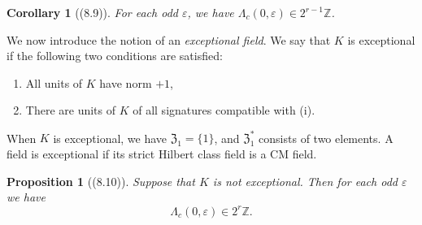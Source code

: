 \documentclass[12pt,a4paper]{article}
\theoremstyle{plain}
\newtheorem{proposition}[theorem]{Proposition}
\newtheorem{corollary}[theorem]{Corollary}
\theoremstyle{definition}
\theoremstyle{remark}
\begin{document}
\begin{corollary}[(8.9)]\label{cor:8.9}
For each odd $\varepsilon$, we have $\varLambda_c(0, \varepsilon) \in 2^{r-1}\mathbb{Z}$.
\end{corollary}

We now introduce the notion of an \emph{exceptional field}. We say that $K$ is exceptional if the following two conditions are satisfied:
\begin{enumerate}[label=\roman*)]
\item All units of $K$ have norm $+1$,
\item There are units of $K$ of all signatures compatible with (i).
\end{enumerate}
When $K$ is exceptional, we have $\mathfrak{Z}_1 = \{1\}$, and $\mathfrak{Z}_1^*$ consists of two elements. A field is exceptional if its strict Hilbert class field is a CM field.

\begin{proposition}[(8.10)]\label{prop:8.10}
Suppose that $K$ is not exceptional. Then for each odd $\varepsilon$ we have
\[
\varLambda_c(0, \varepsilon) \in 2^r \mathbb{Z}.
\]
\end{proposition}
\end{document}
